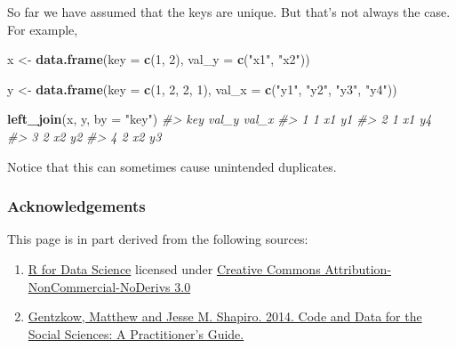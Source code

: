 \documentclass[]{book}
\newenvironment{Shaded}{\begin{snugshade}}{\end{snugshade}}
\newcommand{\CommentTok}[1]{\textcolor[rgb]{0.56,0.35,0.01}{\textit{#1}}}
\newcommand{\DataTypeTok}[1]{\textcolor[rgb]{0.13,0.29,0.53}{#1}}
\newcommand{\DecValTok}[1]{\textcolor[rgb]{0.00,0.00,0.81}{#1}}
\newcommand{\KeywordTok}[1]{\textcolor[rgb]{0.13,0.29,0.53}{\textbf{#1}}}
\newcommand{\NormalTok}[1]{#1}
\newcommand{\StringTok}[1]{\textcolor[rgb]{0.31,0.60,0.02}{#1}}
\begin{document}
So far we have assumed that the keys are unique. But that's not always the case. For example,

\begin{Shaded}
\begin{Highlighting}[]
\NormalTok{x <-}\StringTok{ }\KeywordTok{data.frame}\NormalTok{(}\DataTypeTok{key =} \KeywordTok{c}\NormalTok{(}\DecValTok{1}\NormalTok{, }\DecValTok{2}\NormalTok{),}
               \DataTypeTok{val_y =} \KeywordTok{c}\NormalTok{(}\StringTok{"x1"}\NormalTok{, }\StringTok{"x2"}\NormalTok{))}

\NormalTok{y <-}\StringTok{ }\KeywordTok{data.frame}\NormalTok{(}\DataTypeTok{key =} \KeywordTok{c}\NormalTok{(}\DecValTok{1}\NormalTok{, }\DecValTok{2}\NormalTok{, }\DecValTok{2}\NormalTok{, }\DecValTok{1}\NormalTok{),}
               \DataTypeTok{val_x =} \KeywordTok{c}\NormalTok{(}\StringTok{"y1"}\NormalTok{, }\StringTok{"y2"}\NormalTok{, }\StringTok{"y3"}\NormalTok{, }\StringTok{"y4"}\NormalTok{))}

\KeywordTok{left_join}\NormalTok{(x, y, }\DataTypeTok{by =} \StringTok{"key"}\NormalTok{)}
\CommentTok{#>   key val_y val_x}
\CommentTok{#> 1   1    x1    y1}
\CommentTok{#> 2   1    x1    y4}
\CommentTok{#> 3   2    x2    y2}
\CommentTok{#> 4   2    x2    y3}
\end{Highlighting}
\end{Shaded}

Notice that this can sometimes cause unintended duplicates.

\hypertarget{acknowledgements-2}{%
\subsubsection*{Acknowledgements}\label{acknowledgements-2}}

This page is in part derived from the following sources:

\begin{enumerate}
\def\labelenumi{\arabic{enumi}.}
\item
  \href{https://r4ds.had.co.nz}{R for Data Science} licensed under \href{https://creativecommons.org/licenses/by-nc-nd/3.0/us/}{Creative Commons Attribution-NonCommercial-NoDerivs 3.0}
\item
  \href{https://web.stanford.edu/~gentzkow/research/CodeAndData.pdf}{Gentzkow, Matthew and Jesse M. Shapiro. 2014. Code and Data for the Social Sciences: A Practitioner's Guide.}
\end{enumerate}
\end{document}

